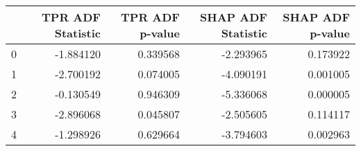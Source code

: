 \begin{tabular}{lrrrr}
\toprule
 & TPR ADF Statistic & TPR ADF p-value & SHAP ADF Statistic & SHAP ADF p-value \\
\midrule
0 & -1.884120 & 0.339568 & -2.293965 & 0.173922 \\
1 & -2.700192 & 0.074005 & -4.090191 & 0.001005 \\
2 & -0.130549 & 0.946309 & -5.336068 & 0.000005 \\
3 & -2.896068 & 0.045807 & -2.505605 & 0.114117 \\
4 & -1.298926 & 0.629664 & -3.794603 & 0.002963 \\
\bottomrule
\end{tabular}
